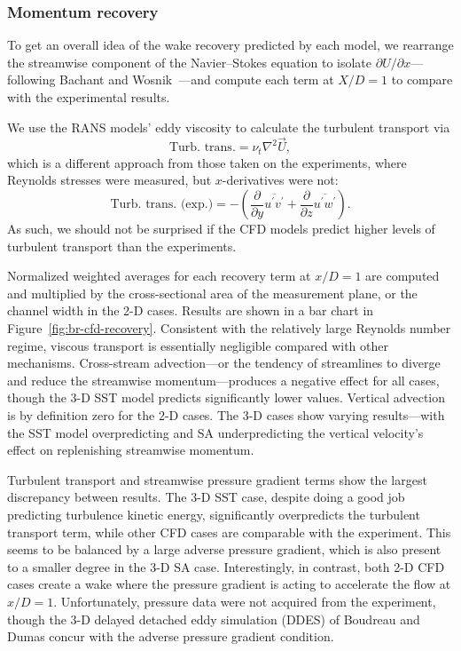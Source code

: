 \subsubsection{Momentum recovery}

To get an overall idea of the wake recovery predicted by each model, we
rearrange the streamwise component of the Navier--Stokes equation to isolate
$\partial U / \partial x$---following Bachant and
Wosnik~\cite{Bachant2015-JoT}---and compute each term at $X/D = 1$ to compare
with the experimental results.

We use the RANS models' eddy viscosity to calculate the turbulent transport via
\begin{equation}
    \text{Turb. trans.} = \nu_t \nabla^2 \vec{U},
    \label{eq:turb-trans}
\end{equation}
which is a different approach from those taken on the experiments, where
Reynolds stresses were measured, but $x$-derivatives were not:
\begin{equation}
    \text{Turb. trans. (exp.)} =
    -\left(
    \frac{\partial}{\partial y} \overline{u^\prime v^\prime}
    +
    \frac{\partial}{\partial z} \overline{u^\prime w^\prime}
    \right).
\end{equation}
As such, we should not be surprised if the CFD models predict higher levels of
turbulent transport than the experiments.

Normalized weighted averages for each recovery term at $x/D=1$ are computed and
multiplied by the cross-sectional area of the measurement plane, or the channel
width in the 2-D cases. Results are shown in a bar chart in
Figure~\ref{fig:br-cfd-recovery}. Consistent with the relatively large Reynolds
number regime, viscous transport is essentially negligible compared with other
mechanisms. Cross-stream advection---or the tendency of streamlines to diverge
and reduce the streamwise momentum---produces a negative effect for all cases,
though the 3-D SST model predicts significantly lower values. Vertical advection
is by definition zero for the 2-D cases. The 3-D cases show varying
results---with the SST model overpredicting and SA underpredicting the vertical
velocity's effect on replenishing streamwise momentum.

Turbulent transport and streamwise pressure gradient terms show the largest
discrepancy between results. The 3-D SST case, despite doing a good job
predicting turbulence kinetic energy, significantly overpredicts the turbulent
transport term, while other CFD cases are comparable with the experiment. This
seems to be balanced by a large adverse pressure gradient, which is also present
to a smaller degree in the 3-D SA case. Interestingly, in contrast, both 2-D CFD
cases create a wake where the pressure gradient is acting to accelerate the flow
at $x/D=1$. Unfortunately, pressure data were not acquired from the experiment,
though the 3-D delayed detached eddy simulation (DDES) of Boudreau and Dumas
\cite{Boudreau2015} concur with the adverse pressure gradient condition.

